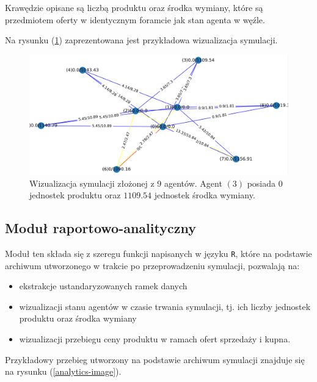 \documentclass{article}
\begin{document}
Krawędzie opisane są liczbą produktu oraz środka wymiany, które są przedmiotem oferty w identycznym foramcie jak stan agenta w węźle. 

Na rysunku (\ref{vis-image}) zaprezentowana jest przykładowa wizualizacja symulacji.

\begin{figure}[H]
	\centering
	\includegraphics[width=\textwidth, height=0.4\textheight]{./vis-image.png}
	\caption{Wizualizacja symulacji złożonej z 9 agentów. Agent $(3)$ posiada 0 jednostek produktu oraz $1109.54$ jednostek środka wymiany.}
	\label{vis-image}
\end{figure}
\subsection{Moduł raportowo-analityczny}

Moduł ten składa się z szeregu funkcji napisanych w języku \texttt{R}, które na podstawie archiwum utworzonego w trakcie po przeprowadzeniu symulacji, pozwalają na:

\begin{itemize}
	\item ekstrakcje ustandaryzowanych ramek danych
	\item wizualizacji stanu agentów w czasie trwania symulacji, tj. ich liczby jednostek produktu oraz środka wymiany
	\item wizualizacji przebiegu ceny produktu w ramach ofert sprzedaży i kupna.
\end{itemize}

Przykładowy przebieg utworzony na podstawie archiwum symulacji znajduje się na rysunku (\ref{analytics-image}).
\end{document}
